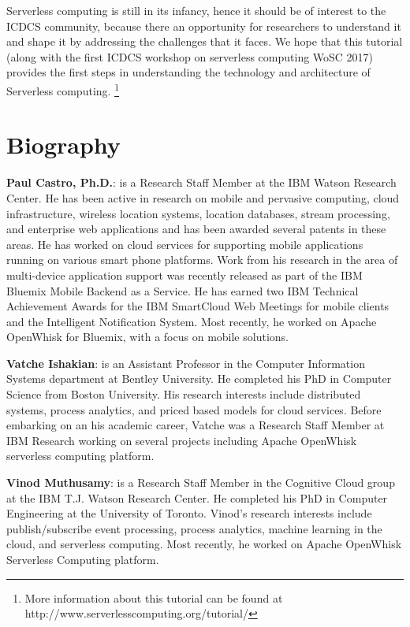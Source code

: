 \documentclass[conference]{IEEEtran}
\begin{document}
Serverless computing is still in its infancy, hence it should be of interest to the ICDCS community, because there an opportunity for researchers to understand it and shape it by addressing the challenges that it faces. We hope that this tutorial (along with the first ICDCS workshop on serverless computing WoSC 2017) provides the first steps in understanding the technology and architecture of Serverless computing. \footnote{More information about this tutorial can be found at http://www.serverlesscomputing.org/tutorial/}

\section{Biography}
{\noindent \bf Paul Castro, Ph.D.}: is a Research Staff Member at the IBM Watson Research Center. He has been active in research on mobile and pervasive computing, cloud infrastructure, wireless location systems, location databases, stream processing, and enterprise web applications and has been awarded several patents in these areas. He has worked on cloud services for supporting mobile applications running on various smart phone platforms. Work from his research in the area of multi-device application support was recently released as part of the IBM Bluemix Mobile Backend as a Service. He has earned two IBM Technical Achievement Awards for the IBM SmartCloud Web Meetings for mobile clients and the Intelligent Notification System. Most recently, he worked on Apache OpenWhisk for Bluemix, with a focus on mobile solutions.

\smallbreak

{\noindent \bf Vatche Ishakian}: is an Assistant Professor in the Computer Information Systems department at Bentley University. He completed his PhD in Computer Science from Boston University. His research interests include distributed systems, process analytics, and priced based models for cloud services. Before embarking on an his academic career, Vatche was a Research Staff Member at IBM Research working on several projects including Apache OpenWhisk serverless computing platform.

\smallbreak

{\noindent \bf Vinod Muthusamy}: is a Research Staff Member in the Cognitive Cloud group at the IBM T.J. Watson Research Center. He completed his PhD in Computer Engineering at the University of Toronto. Vinod's research interests include publish/subscribe event processing, process analytics, machine learning in the cloud, and serverless computing. Most recently, he worked on Apache OpenWhisk Serverless Computing platform.
\end{document}
